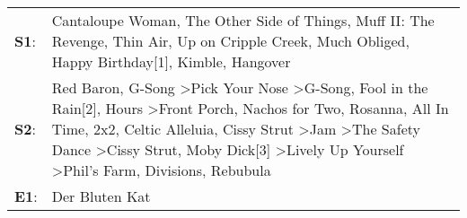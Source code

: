 \begin{supertabular}{p{0.03\textwidth}p{0.92\textwidth}}
 \textbf{S1}:  &                                                                                                                                                                                                                                                                                                                                                                                                                                                                                                                                                       Cantaloupe Woman\textsuperscript{}, \enspace The Other Side of Things\textsuperscript{}, \enspace Muff II: The Revenge\textsuperscript{}, \enspace Thin Air\textsuperscript{}, \enspace Up on Cripple Creek\textsuperscript{}, \enspace Much Obliged\textsuperscript{}, \enspace Happy Birthday[1]\textsuperscript{}, \enspace Kimble\textsuperscript{}, \enspace Hangover\textsuperscript{}  \enspace  \\
 \textbf{S2}:  &  Red Baron\textsuperscript{}, \enspace G-Song\textsuperscript{} \textgreater \enspace Pick Your Nose\textsuperscript{} \textgreater \enspace G-Song\textsuperscript{}, \enspace Fool in the Rain[2]\textsuperscript{}, \enspace Hours\textsuperscript{} \textgreater \enspace Front Porch\textsuperscript{}, \enspace Nachos for Two\textsuperscript{}, \enspace Rosanna\textsuperscript{}, \enspace All In Time\textsuperscript{}, \enspace 2x2\textsuperscript{}, \enspace Celtic Alleluia\textsuperscript{}, \enspace Cissy Strut\textsuperscript{} \textgreater \enspace Jam\textsuperscript{} \textgreater \enspace The Safety Dance\textsuperscript{} \textgreater \enspace Cissy Strut\textsuperscript{}, \enspace Moby Dick[3]\textsuperscript{} \textgreater \enspace Lively Up Yourself\textsuperscript{} \textgreater \enspace Phil's Farm\textsuperscript{}, \enspace Divisions\textsuperscript{}, \enspace Rebubula\textsuperscript{}  \enspace  \\
 \textbf{E1}:  &                                                                                                                                                                                                                                                                                                                                                                                                                                                                                                                                                                                                                                                                                                                                                                                                                                                                                                                   Der Bluten Kat\textsuperscript{}  \enspace  \\
\end{supertabular}
